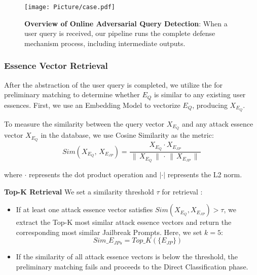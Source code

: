 \begin{figure*}[htbp] 
    \centering
    \texttt{[image: Picture/case.pdf]}
    \caption{\textbf{Overview of Online Adversarial Query Detection}: When a user query is received, our pipeline runs the complete defense mechanism process, including intermediate outputs.}
    \label{fig_case}
\end{figure*}

\subsubsection{Essence Vector Retrieval}
After the abstraction of the user query is completed, we utilize the  for preliminary matching to determine whether \( E_{Q} \) is similar to any existing user essences.
First, we use an Embedding Model to vectorize \( E_{Q} \), producing \( X_{E_{Q}} \).

To measure the similarity between the query vector \( X_{E_{Q}} \) and any attack essence vector  \( X_{E_{Q}} \)  in the database, we use Cosine Similarity as the metric:
\begin{equation}
    \mathit{Sim}\left(\mathit{X}_{E_Q},\, \mathit{X}_{E_{JP}}\right) = \frac{\mathit{X}_{E_Q} \cdot \mathit{X}_{E_{JP}}}{\,\|\,\mathit{X}_{E_Q}\,\|\,\cdot\,\|\,\mathit{X}_{E_{JP}}\,\|\,}
\end{equation}

where $ \cdot $ represents the dot product operation and $|\cdot|$ represents the L2 norm.

\textbf{Top-K Retrieval}
We set a similarity threshold $ \tau$ for retrieval :
\begin{itemize}
    \item If at least one attack essence vector satisfies $\mathit{Sim}\left({X}_{E_Q}, X_{E_{JP}}\right)>\tau$,  we extract the Top-K most similar attack essence vectors and return the corresponding most similar Jailbreak Prompts. Here, we set \(k=5\):
\begin{equation}
    \mathit{Sim\_E_{JPs}} = \mathit{Top\_K} (\{E_{JP}\})
\end{equation}
    \item If the similarity of all attack essence vectors is below the threshold, the preliminary matching fails and proceeds to the Direct Classification phase.
\end{itemize}
